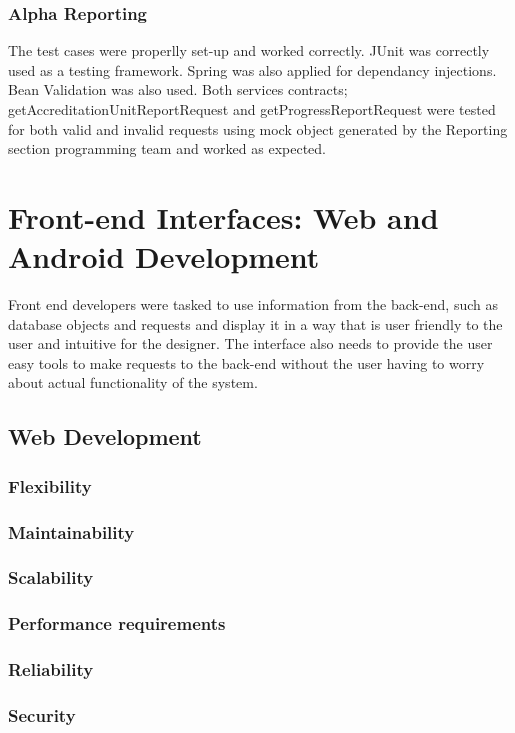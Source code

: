 \documentclass{article}
\begin{document}
	\subsubsection{Alpha Reporting}
	The test cases were properlly set-up and worked correctly. JUnit was correctly used as a testing framework. Spring was also applied for dependancy injections. Bean Validation was also used. Both services contracts; getAccreditationUnitReportRequest and getProgressReportRequest were tested for both valid and invalid requests using mock object generated by the Reporting section programming team and worked as expected. \\



\newpage
\section{Front-end Interfaces: Web and Android Development}
        Front end developers were tasked to use information from the back-end, such as database objects and requests and display it in a way that is user friendly to the user and intuitive for the designer. The interface also needs to provide the user easy tools to make requests to the back-end without the user having to worry about actual functionality of the system.
\subsection{Web Development}
        \subsubsection{Flexibility}
        \subsubsection{Maintainability}
        \subsubsection{Scalability}
        \subsubsection{Performance requirements}
        \subsubsection{Reliability}
        \subsubsection{Security}
\end{document}
